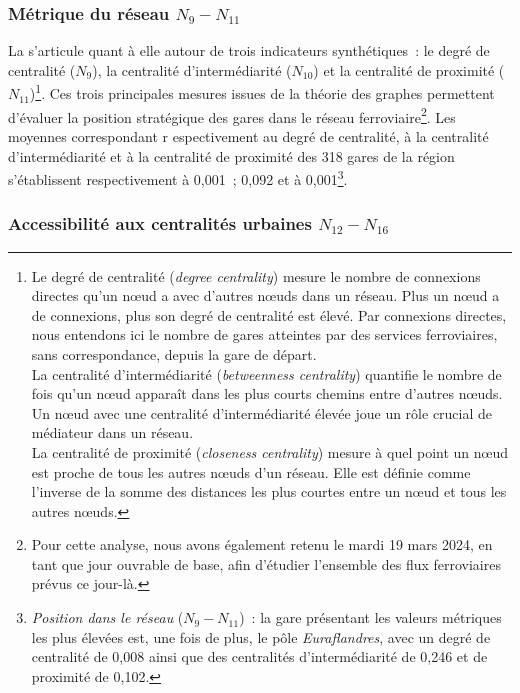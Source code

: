 \begin{refsegment}
\subsubsection*{Métrique du réseau \(N_{9} - N_{11}\)
    \label{chap6:indicateurs-node-metrique}
    }

La  s'articule quant à elle autour de trois indicateurs synthétiques~: le degré de centralité (\(N_{9}\)), la centralité d'intermédiarité (\(N_{10}\)) et la centralité de proximité (\(N_{11}\))\footnote{
    Le degré de centralité (\textsl{degree centrality}) mesure le nombre de connexions directes qu'un nœud a avec d'autres nœuds dans un réseau. Plus un nœud a de connexions, plus son degré de centralité est élevé. Par connexions directes, nous entendons ici le nombre de gares atteintes par des services ferroviaires, sans correspondance, depuis la gare de départ.
    \\
    La centralité d'intermédiarité (\textsl{betweenness centrality}) quantifie le nombre de fois qu'un nœud apparaît dans les plus courts chemins entre d'autres nœuds. Un nœud avec une centralité d'intermédiarité élevée joue un rôle crucial de médiateur dans un réseau.
    \\
    La centralité de proximité (\textsl{closeness centrality}) mesure à quel point un nœud est proche de tous les autres nœuds d'un réseau. Elle est définie comme l'inverse de la somme des distances les plus courtes entre un nœud et tous les autres nœuds.
}. Ces trois principales mesures issues de la théorie des graphes permettent d'évaluer la position stratégique des gares dans le réseau ferroviaire\footnote{
    Pour cette analyse, nous avons également retenu le mardi 19 mars 2024, en tant que jour ouvrable de base, afin d'étudier l'ensemble des flux ferroviaires prévus ce jour-là.
}. Les moyennes correspondant r
espectivement au degré de centralité, à la centralité d'intermédiarité et à la centralité de proximité des 318 gares de la région s'établissent respectivement à 0,001~; 0,092 et à 0,001\footnote{
    \textsl{Position dans le réseau} (\(N_{9} - N_{11}\))~: la gare présentant les valeurs métriques les plus élevées est, une fois de plus, le pôle \textsl{Euraflandres}, avec un degré de centralité de 0,008 ainsi que des centralités d'intermédiarité de 0,246 et de proximité de 0,102.
}.%

\subsubsection*{Accessibilité aux centralités urbaines \(N_{12} - N_{16}\)
    \label{chap6:indicateurs-node-accessibilite-centralites}
    }


\end{refsegment}
